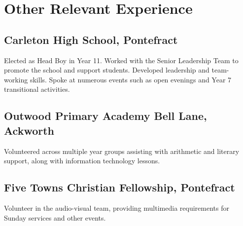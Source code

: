\documentclass[9pt]{extarticle}
\begin{document}
\begin{minipage}{0.6\textwidth}
	\section{Other Relevant Experience}
	\subsection{Carleton High School, Pontefract}
	Elected as Head Boy in Year 11. Worked with the Senior Leadership Team to promote the school and support students. Developed leadership and team-working skills. Spoke at numerous events such as open evenings and Year 7 transitional activities.

	\vspace{.3cm}

	\subsection{Outwood Primary Academy Bell Lane, Ackworth}
	Volunteered across multiple year groups assisting with arithmetic and literary support, along with information technology lessons.

	\vspace{.3cm}
	\subsection{Five Towns Christian Fellowship, Pontefract}
	Volunteer in the audio-visual team, providing multimedia requirements for Sunday services and other events.

\end{minipage}
\hspace{1cm}
\end{document}

